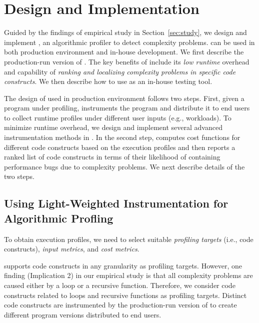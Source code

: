 \section{\Tool Design and Implementation}
\label{sec:online}


Guided by the findings of empirical study in Section~\ref{sec:study},
we design and implement \Tool, an algorithmic
profiler to detect complexity problems. \Tool
can be used in both production environment 
and in-house development. We first describe
the production-run version of \Tool. 
The key benefits of \Tool include its \emph{low runtime} 
overhead and capability of \emph{ranking 
and localizing complexity problems in specific code constructs}. 
We then describe how to use \Tool as an in-house testing tool. 

The design of \Tool used in production environment 
follows two steps. First, given a program under profiling,
\Tool instruments the program and
distribute it to end users to collect runtime profiles
under different user inputs (e.g., workloads). 
To minimize runtime overhead, we design and implement
several advanced instrumentation methods in \Tool. 
In the second step, \Tool computes cost functions for
different code constructs based on the execution profiles
and then reports a ranked list of code constructs in
terms of their likelihood of containing performance bugs due to
complexity problems.  
We next describe details of the two steps. 


\subsection{Using Light-Weighted Instrumentation 
for Algorithmic Profling}

To obtain execution profiles, we need to select suitable 
\emph{profiling targets} (i.e.,
code constructs), \emph{input metrics}, and \emph{cost metrics}. 

\Tool supports code constructs in any granularity as profiling targets. 
However, one finding (Implication 2) in our empirical study is 
that all complexity problems are 
caused either by a loop or a recursive function. 
Therefore, we consider code constructs related 
to loops and recursive functions as profiling targets. 
Distinct code constructs are instrumented by the production-run
version of \Tool to create different program versions distributed
to end users.

